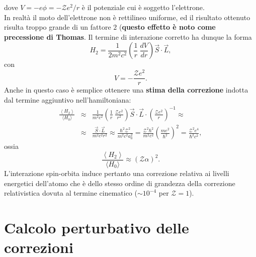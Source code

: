 dove $V=-e\phi=-\mathcal{Z}e^2/r$ è il potenziale cui è soggetto l'elettrone. \\
In realtà il moto dell'elettrone non è rettilineo uniforme, ed il risultato ottenuto risulta troppo grande di un fattore $2$ (\textbf{questo effetto è noto come precessione di Thomas}. Il termine di interazione corretto ha dunque la forma
\begin{equation} \label{eq:cap25_3}
H_2=\frac{1}{2m^2c^2} \left( \frac{1}{r} \ \frac{dV}{dr} \right) \vec{S} \cdot \vec{L} ,
\end{equation}
con
\begin{equation} 
V=-\frac{\mathcal{Z}e^2}{r} .
\end{equation}
Anche in questo caso è semplice ottenere una \textbf{stima della correzione} indotta dal termine aggiuntivo nell'hamiltoniana:
\begin{eqnarray}
\frac{\left< H_2 \right>}{\langle H_0 \rangle} & \approx & \frac{1}{m^2c^2} \left( \frac{1}{r} \ \frac{\mathcal{Z}e^2}{r^2} \right) \vec{S} \cdot \vec{L} \cdot \left( \frac{\mathcal{Z}e^2}{r} \right)^{-1} \approx \nonumber  \\
& \approx &\frac{\vec{S} \cdot \vec{L}}{m^2c^2r^2} \approx  \frac{\hbar^2 \mathcal{Z}^2}{m^2c^2a_0^2}=  \frac{\mathcal{Z}^2 \hbar^2}{m^2c^2}\left( \frac{me^2}{\hbar^2} \right)^2= \frac{\mathcal{Z}^2e^4}{\hbar^2c^2} ,
\end{eqnarray}
ossia
\begin{equation} 
\frac{\left< H_2 \right>}{\langle H_0 \rangle} \approx \left( \mathcal{Z}\alpha \right)^2 .
\end{equation}
L'interazione spin-orbita induce pertanto una correzione relativa ai livelli energetici dell'atomo che è dello stesso ordine di grandezza della correzione relativistica dovuta al termine cinematico ($\sim10^{-4}$ per $\mathcal{Z}=1$).
\section{Calcolo perturbativo delle correzioni}


